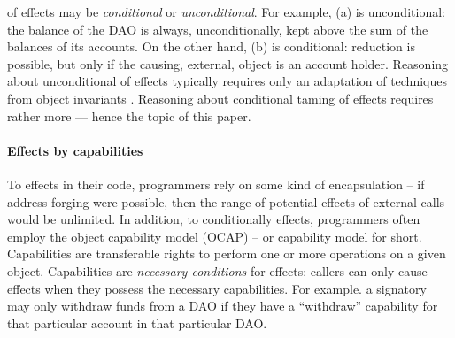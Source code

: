 
 
{\Taming of effects may be   \emph{conditional} or \emph{unconditional}.
For example, (a) is unconditional: the balance of the DAO is always, unconditionally, kept above the sum of the balances of its accounts.
On the other hand, (b) is conditional: %
 reduction is possible, but only 
if the causing, external, object is an account holder.}
Reasoning about {unconditional}  \taming of  effects     typically requires only an adaptation of
  techniques from %
object  invariants \cite{staticsfull,DrossoFrancaMuellerSummers08,BarDelFahLeiSch04,objInvars,MuellerPoetzsch-HeffterLeavens06}.
  Reasoning about  {conditional} taming of    effects
requires rather more --- {hence} the topic of this paper. 

\paragraph{Effects \tamed by capabilities} 
To \tame  effects  in their code, 
programmers   {rely on some kind of encapsulation -- \eg if address forging were possible, then 
the  range of potential effects of external calls would be unlimited. 
In addition, to conditionally \tame effects, programmers often}
employ  the object capability model (OCAP)\cite{MillerPhD} --
 or capability model for short. 
Capabilities are transferable rights to perform one or more operations on a given object.
Capabilities are  {\emph{necessary conditions} for effects:}   
 callers can only cause effects when they possess the necessary capabilities.
For example. a signatory may only withdraw funds from a DAO 
  if they have a ``withdraw''
capability for that particular account in that particular DAO.

